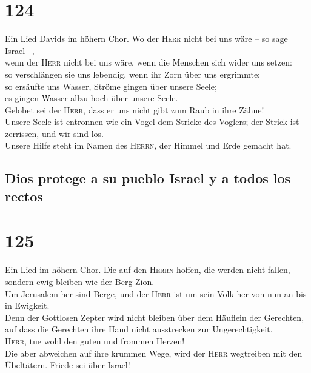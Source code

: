 \hypertarget{section-123}{%
\section{124}\label{section-123}}

 Ein Lied Davids im höhern Chor. Wo der \textsc{Herr}
nicht bei uns wäre -- so sage Israel --,\\
 wenn der \textsc{Herr} nicht bei uns wäre, wenn die
Menschen sich wider uns setzen:\\
 so verschlängen sie uns lebendig, wenn ihr Zorn über uns
ergrimmte;\\
 so ersäufte uns Wasser, Ströme gingen über unsere
Seele;\\
 es gingen Wasser allzu hoch über unsere Seele.\\
 Gelobet sei der \textsc{Herr}, dass er uns nicht gibt zum
Raub in ihre Zähne!\\
 Unsere Seele ist entronnen wie ein Vogel dem Stricke des
Voglers; der Strick ist zerrissen, und wir sind los.\\
 Unsere Hilfe steht im Namen des \textsc{Herrn}, der
Himmel und Erde gemacht hat.

\hypertarget{dios-protege-a-su-pueblo-israel-y-a-todos-los-rectos}{%
\subsection{Dios protege a su pueblo Israel y a todos los
rectos}\label{dios-protege-a-su-pueblo-israel-y-a-todos-los-rectos}}

\hypertarget{section-124}{%
\section{125}\label{section-124}}

 Ein Lied im höhern Chor. Die auf den \textsc{Herrn}
hoffen, die werden nicht fallen, sondern ewig bleiben wie der Berg
Zion.\\
 Um Jerusalem her sind Berge, und der \textsc{Herr} ist um
sein Volk her von nun an bis in Ewigkeit.\\
 Denn der Gottlosen Zepter wird nicht bleiben über dem
Häuflein der Gerechten, auf dass die Gerechten ihre Hand nicht
ausstrecken zur Ungerechtigkeit.\\
 \textsc{Herr}, tue wohl den guten und frommen Herzen!\\
 Die aber abweichen auf ihre krummen Wege, wird der
\textsc{Herr} wegtreiben mit den Übeltätern. Friede sei über Israel!

